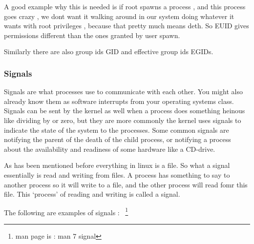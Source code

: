 A good example why this is needed is if root spawns a process , and this process
goes crazy , we dont want it walking around in our system doing whatever it
wants with root privileges , because that pretty much means deth. So EUID gives
permissions different than the ones granted by user spawn.

Similarly there are also group ids GID and effective group ids EGIDs.

\subsubsection{Signals}
\label{sssec:signals}

Signals are what processes use to communicate with each other. You might also
already know them as software interrupts from your operating systems class.
Signals can be sent by the kernel as well when a process does something heinous
like dividing by or zero, but they are more commonly the kernel uses signals to
indicate the state of the system to the processes. Some common signals are
notifying the parent of the death of the child process, or notifying a process
about the availability and readiness of some hardware like a CD-drive.

As has been mentioned before everything in linux is a file. So what a signal
essentially is read and writing from files. A process has something to say to
another process so it will write to a file, and the other process will read fomr
this file. This `process' of reading and writing is called a signal.

The following are examples of signals :
~\footnote{man page is : man 7 signal}



